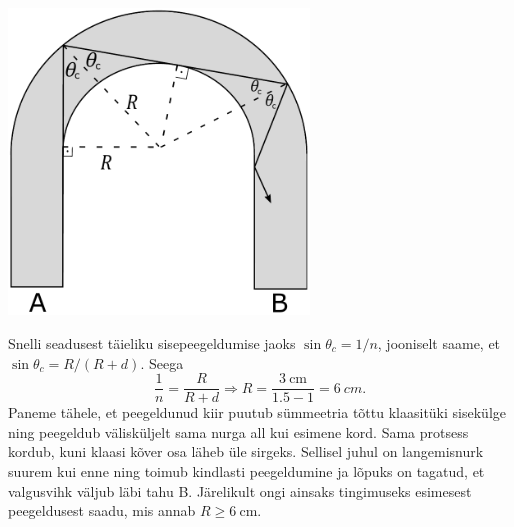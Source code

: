 \begin{center}
	\includegraphics[width=0.6\textwidth]{2020-lahg-03-sol.pdf} 
\end{center}

Snelli seadusest täieliku sisepeegeldumise jaoks
$\sin\theta_c = {1}/{n}$, jooniselt saame, et $\sin\theta_c=R/(R+d)$. Seega
$$\frac{1}{n}=\frac{R}{R+d}\Rightarrow R = \frac{\SI{3}{\cm}}{1.5-1}=\SI{6}{cm}.$$
Paneme tähele, et peegeldunud kiir puutub sümmeetria tõttu klaasitüki sisekülge ning peegeldub välisküljelt sama nurga all kui esimene kord. Sama protsess kordub, kuni klaasi kõver osa läheb üle sirgeks. Sellisel juhul on langemisnurk suurem kui enne ning toimub kindlasti peegeldumine ja lõpuks on tagatud, et valgusvihk väljub läbi tahu B. Järelikult ongi ainsaks tingimuseks esimesest peegeldusest saadu, mis annab $R\geq\SI{6}{\cm}$.
\probend